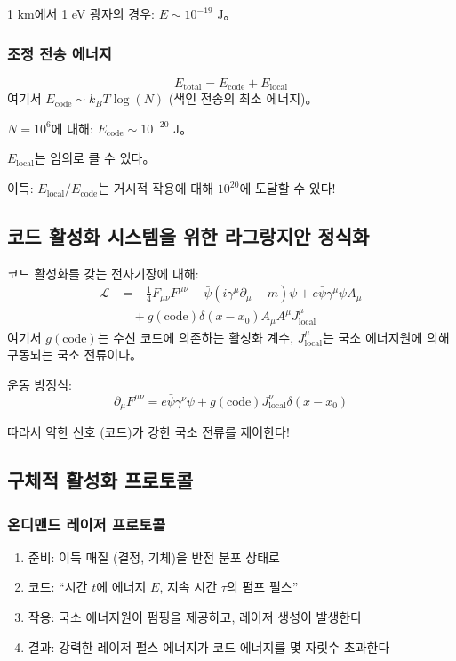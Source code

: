 \documentclass[11pt,a4paper]{article}
\begin{document}
1 km에서 1 eV 광자의 경우: $E \sim 10^{-19}$ J。

\subsubsection{조정 전송 에너지}
\begin{equation}
E_{\text{total}} = E_{\text{code}} + E_{\text{local}}
\end{equation}
여기서 $E_{\text{code}} \sim k_B T \log(N)$ (색인 전송의 최소 에너지)。

$N=10^6$에 대해: $E_{\text{code}} \sim 10^{-20}$ J。

$E_{\text{local}}$는 임의로 클 수 있다。

이득: $E_{\text{local}} / E_{\text{code}}$는 거시적 작용에 대해 $10^{20}$에 도달할 수 있다!

\subsection{코드 활성화 시스템을 위한 라그랑지안 정식화}

코드 활성화를 갖는 전자기장에 대해:
\begin{align}
\mathcal{L} &= -\frac{1}{4} F_{\mu\nu} F^{\mu\nu} + \bar{\psi}(i\gamma^\mu\partial_\mu - m)\psi + e\bar{\psi}\gamma^\mu\psi A_\mu \\
&\quad + g(\text{code}) \delta(x - x_0) A_\mu A^\mu J_{\text{local}}^\mu
\end{align}
여기서 $g(\text{code})$는 수신 코드에 의존하는 활성화 계수, $J_{\text{local}}^\mu$는 국소 에너지원에 의해 구동되는 국소 전류이다。

운동 방정식:
\begin{equation}
\partial_\mu F^{\mu\nu} = e\bar{\psi}\gamma^\nu\psi + g(\text{code}) J_{\text{local}}^\nu \delta(x - x_0)
\end{equation}

따라서 약한 신호 (코드)가 강한 국소 전류를 제어한다!

\subsection{구체적 활성화 프로토콜}

\subsubsection{온디맨드 레이저 프로토콜}
\begin{enumerate}
\item 준비: 이득 매질 (결정, 기체)을 반전 분포 상태로
\item 코드: ``시간 $t$에 에너지 $E$, 지속 시간 $\tau$의 펌프 펄스''
\item 작용: 국소 에너지원이 펌핑을 제공하고, 레이저 생성이 발생한다
\item 결과: 강력한 레이저 펄스 에너지가 코드 에너지를 몇 자릿수 초과한다
\end{enumerate}
\end{document}
